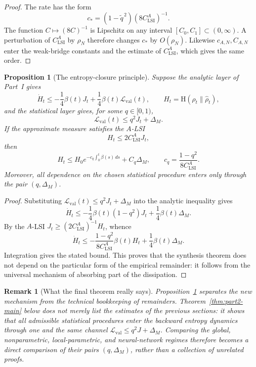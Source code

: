\documentclass{article}
\newtheorem{proposition}[theorem]{Proposition}
\newtheorem{remark}[theorem]{Remark}
\newcommand{\Ent}{\mathrm H}
\newcommand{\Eval}{\mathcal L_{\mathrm{val}}}
\begin{document}
\begin{proof}
The rate has the form
\[
        c_*=(1-\widetilde q^{\,2})(8C_{\mathrm{LSI}}^A)^{-1}.
\]
The function \(C\mapsto (8C)^{-1}\) is Lipschitz on any interval
\([C_0, C_1]\subset(0,\infty)\). A perturbation of \(C_{\mathrm{LSI}}^A\) by
\(\rho_N\) therefore changes \(c_*\) by \(O(\rho_N)\). Likewise \(c_{A,N},C_{A,N}\)
enter the weak-bridge constants and the estimate of \(C_{\mathrm{LSI}}^A\), which
gives the same order.
\end{proof}


\begin{proposition}[The entropy-closure principle]
\label{prop:entropy-closure-principle}
Suppose the analytic layer of Part~I gives
\[
        \dot H_t\le -\frac14\beta(t)J_t+\frac14\beta(t)\Eval(t),
        \qquad H_t=\Ent(\rho_t\|\hat\rho_t),
\]
and the statistical layer gives, for some \(q\in[0,1)\),
\[
        \Eval(t)\le q^2J_t+\Delta_M .
\]
If the approximate measure satisfies the \(A\)-LSI
\[
        H_t\le 2C_{\mathrm{LSI}}^AJ_t,
\]
then
\[
        H_t\le H_0e^{-c_q\int_0^t\beta(s)\,ds}
        +C_q\Delta_M,
        \qquad
        c_q=\frac{1-q^2}{8C_{\mathrm{LSI}}^A}.
\]
Moreover, all dependence on the chosen statistical procedure enters only through
the pair \((q,\Delta_M)\).
\end{proposition}

\begin{proof}
Substituting \(\Eval(t)\le q^2J_t+\Delta_M\) into the analytic inequality gives
\[
        \dot H_t\le -\frac14\beta(t)(1-q^2)J_t+\frac14\beta(t)\Delta_M.
\]
By the \(A\)-LSI \(J_t\ge (2C_{\mathrm{LSI}}^A)^{-1}H_t\), whence
\[
        \dot H_t\le -\frac{1-q^2}{8C_{\mathrm{LSI}}^A}\beta(t)H_t
        +\frac14\beta(t)\Delta_M.
\]
Integration gives the stated bound. This proves that the synthesis theorem does
not depend on the particular form of the empirical remainder: it follows from the
universal mechanism of absorbing part of the dissipation.
\end{proof}

\begin{remark}[What the final theorem really says]
Proposition~\ref{prop:entropy-closure-principle} separates the new mechanism from
the technical bookkeeping of remainders. Theorem~\ref{thm:part2-main} below does
not merely list the estimates of the previous sections: it shows that all
admissible statistical procedures enter the backward entropy dynamics through one
and the same channel \(\Eval\le q^2J+\Delta_M\). Comparing the global,
nonparametric, local-parametric, and neural-network regimes therefore becomes a
direct comparison of their pairs \((q,\Delta_M)\), rather than a collection of
unrelated proofs.
\end{remark}
\end{document}
